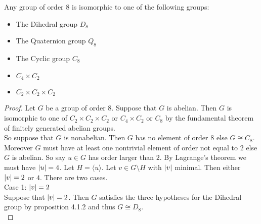 \documentclass[a4paper]{article}
\begin{document}
\begin{thm}{}{} Any group of order $8$ is isomorphic to one of the following groups: 
\begin{itemize}
\item The Dihedral group $D_8$
\item The Quaternion group $Q_8$
\item The Cyclic group $C_8$
\item $C_4\times C_2$
\item $C_2\times C_2\times C_2$
\end{itemize} 
\begin{proof}
Let $G$ be a group of order $8$. Suppose that $G$ is abelian. Then $G$ is isomorphic to one of $C_2\times C_2\times C_2$ or $C_4\times C_2$ or $C_8$ by the fundamental theorem of finitely generated abelian groups. \\
So suppose that $G$ is nonabelian. Then $G$ has no element of order $8$ else $G\cong C_8$. Moreover $G$ must have at least one nontrivial element of order not equal to $2$ else $G$ is abelian. So say $u\in G$ has order larger than $2$. By Lagrange's theorem we must have $\abs{u}=4$. Let $H=\langle u\rangle$. Let $v\in G\setminus H$ with $\abs{v}$ minimal. Then either $\abs{v}=2$ or $4$. There are two cases. \\

Case 1: $\abs{v}=2$\\
Suppose that $\abs{v}=2$. Then $G$ satisfies the three hypotheses for the Dihedral group by proposition 4.1.2 and thus $G\cong D_8$. \\


\end{proof}
\end{thm}
\end{document}
